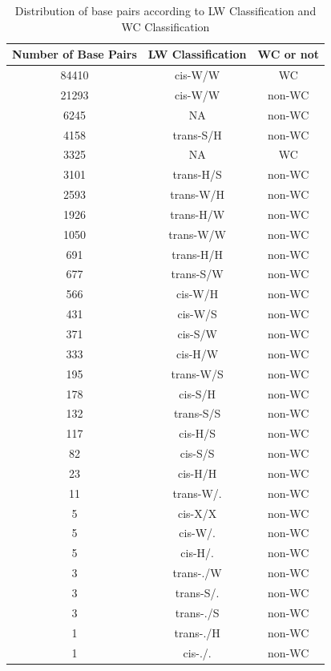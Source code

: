 \begin{center}
\begin{longtable}{c|c|c}
\caption{Distribution of base pairs according to LW Classification and WC Classification}\\ \hline
\bf{Number of Base Pairs} & \bf{LW Classification} & \bf{WC or not} \\ \hline \hline
84410 & cis-W/W & WC \\  \hline
21293 & cis-W/W & non-WC \\  \hline
6245 & NA & non-WC \\  \hline
4158 & trans-S/H & non-WC \\  \hline
3325 & NA & WC \\  \hline
3101 & trans-H/S & non-WC \\  \hline
2593 & trans-W/H & non-WC \\  \hline
1926 & trans-H/W & non-WC \\  \hline
1050 & trans-W/W & non-WC \\  \hline
691 & trans-H/H & non-WC \\  \hline
677 & trans-S/W & non-WC \\  \hline
566 & cis-W/H & non-WC \\  \hline
431 & cis-W/S & non-WC \\  \hline
371 & cis-S/W & non-WC \\  \hline
333 & cis-H/W & non-WC \\  \hline
195 & trans-W/S & non-WC \\  \hline
178 & cis-S/H & non-WC \\  \hline
132 & trans-S/S & non-WC \\  \hline
117 & cis-H/S & non-WC \\  \hline
82 & cis-S/S & non-WC \\  \hline
23 & cis-H/H & non-WC \\  \hline
11 & trans-W/. & non-WC \\  \hline
5 & cis-X/X & non-WC \\  \hline
5 & cis-W/. & non-WC \\  \hline
5 & cis-H/. & non-WC \\  \hline
3 & trans-./W & non-WC \\  \hline
3 & trans-S/. & non-WC \\  \hline
3 & trans-./S & non-WC \\  \hline
1 & trans-./H & non-WC \\  \hline
1 & cis-./. & non-WC \\  \hline
\end{longtable}
\end{center}


